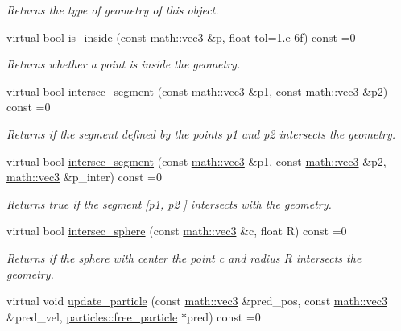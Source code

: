\begin{DoxyCompactItemize}
\begin{DoxyCompactList}\small\item\em Returns the type of geometry of this object. \end{DoxyCompactList}\item 
virtual bool \hyperlink{classphysim_1_1geometry_1_1geometry_a8ae67bba78a06e3c41b7f5b5903b897d}{is\+\_\+inside} (const \hyperlink{structphysim_1_1math_1_1vec3}{math\+::vec3} \&p, float tol=1.e-\/6f) const =0
\begin{DoxyCompactList}\small\item\em Returns whether a point is inside the geometry. \end{DoxyCompactList}\item 
virtual bool \hyperlink{classphysim_1_1geometry_1_1geometry_a0acdb44e41727b9d24afeb9a445c56b7}{intersec\+\_\+segment} (const \hyperlink{structphysim_1_1math_1_1vec3}{math\+::vec3} \&p1, const \hyperlink{structphysim_1_1math_1_1vec3}{math\+::vec3} \&p2) const =0
\begin{DoxyCompactList}\small\item\em Returns if the segment defined by the points {\itshape p1} and {\itshape p2} intersects the geometry. \end{DoxyCompactList}\item 
virtual bool \hyperlink{classphysim_1_1geometry_1_1geometry_a8c505467e81b6da4dcf01a48a4546ba9}{intersec\+\_\+segment} (const \hyperlink{structphysim_1_1math_1_1vec3}{math\+::vec3} \&p1, const \hyperlink{structphysim_1_1math_1_1vec3}{math\+::vec3} \&p2, \hyperlink{structphysim_1_1math_1_1vec3}{math\+::vec3} \&p\+\_\+inter) const =0
\begin{DoxyCompactList}\small\item\em Returns true if the segment \mbox{[}{\itshape p1}, {\itshape p2} \mbox{]} intersects with the geometry. \end{DoxyCompactList}\item 
virtual bool \hyperlink{classphysim_1_1geometry_1_1geometry_a3e37ab4d3b7674d6ce243dc51695693a}{intersec\+\_\+sphere} (const \hyperlink{structphysim_1_1math_1_1vec3}{math\+::vec3} \&c, float R) const =0
\begin{DoxyCompactList}\small\item\em Returns if the sphere with center the point {\itshape c} and radius {\itshape R} intersects the geometry. \end{DoxyCompactList}\item 
virtual void \hyperlink{classphysim_1_1geometry_1_1geometry_abbf5d7e5e0214d3c2cf95064f552928d}{update\+\_\+particle} (const \hyperlink{structphysim_1_1math_1_1vec3}{math\+::vec3} \&pred\+\_\+pos, const \hyperlink{structphysim_1_1math_1_1vec3}{math\+::vec3} \&pred\+\_\+vel, \hyperlink{classphysim_1_1particles_1_1free__particle}{particles\+::free\+\_\+particle} $\ast$pred) const =0

\end{DoxyCompactItemize}
